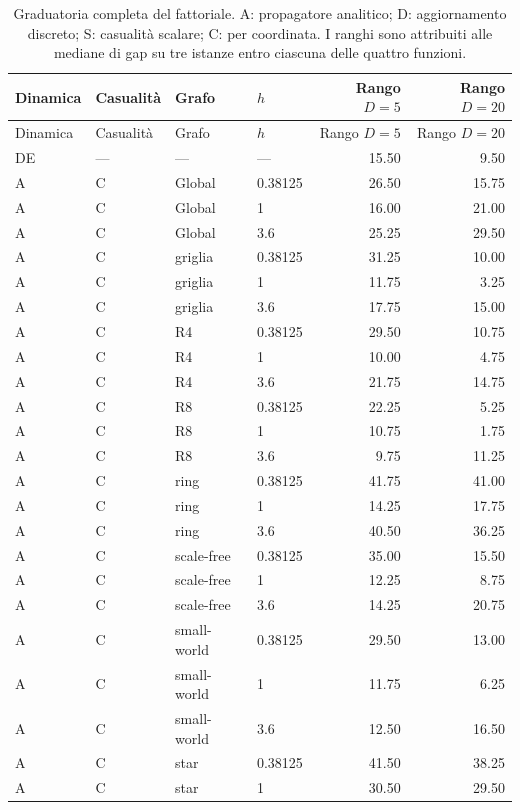 \clearpage\begingroup\footnotesize\setlength{\tabcolsep}{6pt}\renewcommand{\arraystretch}{0.96}
\begin{longtable}{@{}llllrr@{}}
\caption{Graduatoria completa del fattoriale. A: propagatore analitico; D: aggiornamento discreto; S: casualità scalare; C: per coordinata. I ranghi sono attribuiti alle mediane di gap su tre istanze entro ciascuna delle quattro funzioni.}\label{tab:controlled-ranks}\\
\toprule Dinamica & Casualità & Grafo & $h$ & Rango $D=5$ & Rango $D=20$\\\midrule\endfirsthead
\toprule Dinamica & Casualità & Grafo & $h$ & Rango $D=5$ & Rango $D=20$\\\midrule\endhead
\bottomrule\endfoot
DE & --- & --- & --- & 15.50 & 9.50\\
A & C & Global & 0.38125 & 26.50 & 15.75\\
A & C & Global & 1 & 16.00 & 21.00\\
A & C & Global & 3.6 & 25.25 & 29.50\\
A & C & griglia & 0.38125 & 31.25 & 10.00\\
A & C & griglia & 1 & 11.75 & 3.25\\
A & C & griglia & 3.6 & 17.75 & 15.00\\
A & C & R4 & 0.38125 & 29.50 & 10.75\\
A & C & R4 & 1 & 10.00 & 4.75\\
A & C & R4 & 3.6 & 21.75 & 14.75\\
A & C & R8 & 0.38125 & 22.25 & 5.25\\
A & C & R8 & 1 & 10.75 & 1.75\\
A & C & R8 & 3.6 & 9.75 & 11.25\\
A & C & ring & 0.38125 & 41.75 & 41.00\\
A & C & ring & 1 & 14.25 & 17.75\\
A & C & ring & 3.6 & 40.50 & 36.25\\
A & C & scale-free & 0.38125 & 35.00 & 15.50\\
A & C & scale-free & 1 & 12.25 & 8.75\\
A & C & scale-free & 3.6 & 14.25 & 20.75\\
A & C & small-world & 0.38125 & 29.50 & 13.00\\
A & C & small-world & 1 & 11.75 & 6.25\\
A & C & small-world & 3.6 & 12.50 & 16.50\\
A & C & star & 0.38125 & 41.50 & 38.25\\
A & C & star & 1 & 30.50 & 29.50\\

\end{longtable}
